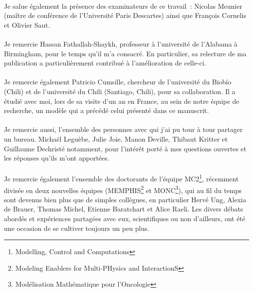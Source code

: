 \paragraph{}
Je salue également la présence des examinateurs de ce travail~: Nicolas Meunier (maître de conférence de l'Université Paris Descartes) ainsi que François Cornelis et Olivier Saut. 


\paragraph{}
Je remercie Hassan Fathallah-Shaykh, professeur à l'université de l'Alabama à Birmingham, pour le temps qu'il m'a consacré. En particulier, sa relecture de ma publication a particulièrement contribué à l'amélioration de celle-ci.

\paragraph{}
Je remercie également Patricio Cumsille, chercheur de l'université du Biobío (Chili) et de l'université du Chili (Santiago, Chili), pour sa collaboration. Il a étudié avec moi, lors de sa visite d'un an en France, au sein de notre équipe de recherche, un modèle qui a précédé celui présenté dans ce manuscrit. 

\paragraph{}
Je remercie aussi, l'ensemble des personnes avec qui j'ai pu tour à tour partager un bureau. Michaël Leguèbe, Julie Joie, Manon Deville, Thibaut Kritter et Guillaume Dechristé notamment, pour l'intérêt porté à mes questions ouvertes et les réponses qu'ils m'ont apportées. 

\paragraph{}
Je remercie également l'ensemble des doctorants de l'équipe MC2\footnote{Modelling, Control and Computations}, récemment divisée en deux nouvelles équipes (MEMPHIS\footnote{Modeling Enablers for Multi-PHysics and InteractionS} et MONC\footnote{Modélisation Mathématique pour l'Oncologie}), qui au fil du temps sont devenus bien plus que de simples collègues, en particulier Hervé Ung, Alexia de Brauer, Thomas Michel, Etienne Baratchart et Alice Raeli. Les divers débats abordés et expériences partagées avec eux, scientifiques ou non d'ailleurs, ont été une occasion de se cultiver toujours un peu plus.


